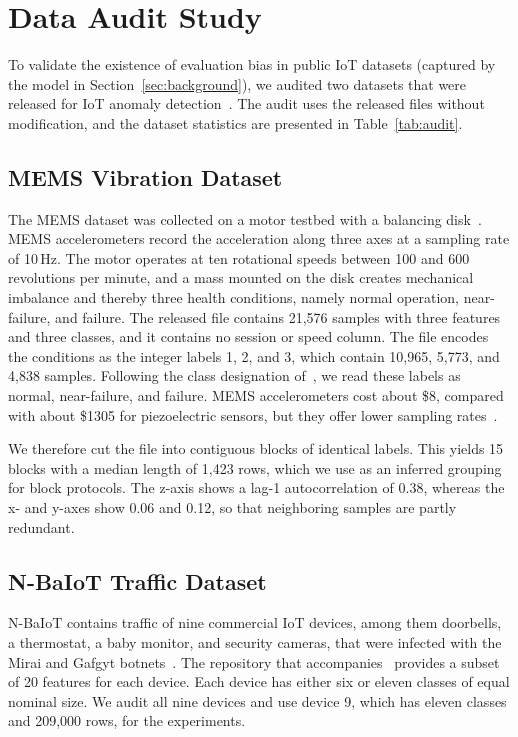 \section{Data Audit Study}\label{sec:audit}
To validate the existence of evaluation bias in public IoT datasets (captured by the model in Section~\ref{sec:background}), we audited two datasets that were released for IoT anomaly detection~\cite{gummadi2024xaiiot}. The audit uses the released files without modification, and the dataset statistics are presented in Table~\ref{tab:audit}.

\subsection{MEMS Vibration Dataset}
The MEMS dataset was collected on a motor testbed with a balancing disk~\cite{gummadi2024xaiiot,abdallah2023sensors}. MEMS accelerometers record the acceleration along three axes at a sampling rate of 10\,Hz. The motor operates at ten rotational speeds between 100 and 600 revolutions per minute, and a mass mounted on the disk creates mechanical imbalance and thereby three health conditions, namely normal operation, near-failure, and failure. The released file contains 21,576 samples with three features and three classes, and it contains no session or speed column. The file encodes the conditions as the integer labels 1, 2, and 3, which contain 10,965, 5,773, and 4,838 samples. Following the class designation of~\cite{gummadi2024xaiiot}, we read these labels as normal, near-failure, and failure. MEMS accelerometers cost about \$8, compared with about \$1305 for piezoelectric sensors, but they offer lower sampling rates~\cite{gummadi2024xaiiot}.

We therefore cut the file into contiguous blocks of identical labels. This yields 15 blocks with a median length of 1,423 rows, which we use as an inferred grouping for block protocols. The z-axis shows a lag-1 autocorrelation of 0.38, whereas the x- and y-axes show 0.06 and 0.12, so that neighboring samples are partly redundant.

\subsection{N-BaIoT Traffic Dataset}
N-BaIoT contains traffic of nine commercial IoT devices, among them doorbells, a thermostat, a baby monitor, and security cameras, that were infected with the Mirai and Gafgyt botnets~\cite{meidan2018nbaiot,antonakakis2017}. The repository that accompanies~\cite{gummadi2024xaiiot} provides a subset of 20 features for each device. Each device has either six or eleven classes of equal nominal size. We audit all nine devices and use device 9, which has eleven classes and 209,000 rows, for the experiments.


